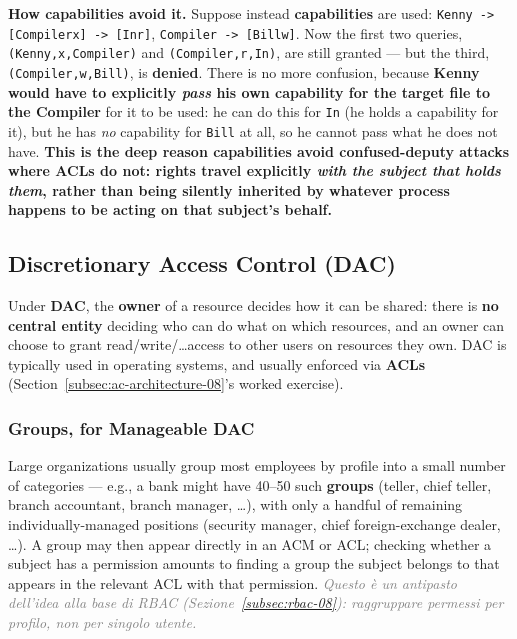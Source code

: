 \documentclass[12pt, a4paper]{article}
\begin{document}
\textcolor{ForestGreen!60!black}{\textbf{How capabilities avoid it.}} Suppose instead \textbf{capabilities} are used: \texttt{Kenny -> [Compiler\textbar x] -> [In\textbar r]}, \texttt{Compiler -> [Bill\textbar w]}. Now the first two queries, \texttt{(Kenny,x,Compiler)} and \texttt{(Compiler,r,In)}, are still granted --- but the third, \texttt{(Compiler,w,Bill)}, is \textbf{denied}. There is no more confusion, because \textbf{Kenny would have to explicitly \emph{pass} his own capability for the target file to the Compiler} for it to be used: he can do this for \texttt{In} (he holds a capability for it), but he has \emph{no} capability for \texttt{Bill} at all, so he cannot pass what he does not have. \textcolor{blue!50!black}{\textbf{This is the deep reason capabilities avoid confused-deputy attacks where ACLs do not: rights travel explicitly \emph{with the subject that holds them}, rather than being silently inherited by whatever process happens to be acting on that subject's behalf.}}













\subsection{Discretionary Access Control (DAC)}
\label{subsec:dac-08}

Under \textbf{DAC}, the \textbf{owner} of a resource decides how it can be shared: there is \textbf{no central entity} deciding who can do what on which resources, and an owner can choose to grant read/write/\dots access to other users on resources they own. DAC is typically used in operating systems, and usually enforced via \textbf{ACLs} (Section~\ref{subsec:ac-architecture-08}'s worked exercise).

\subsubsection{Groups, for Manageable DAC}
Large organizations usually group most employees by profile into a small number of categories --- e.g., a bank might have 40--50 such \textbf{groups} (teller, chief teller, branch accountant, branch manager, \dots), with only a handful of remaining individually-managed positions (security manager, chief foreign-exchange dealer, \dots). A group may then appear directly in an ACM or ACL; checking whether a subject has a permission amounts to finding a group the subject belongs to that appears in the relevant ACL with that permission. \textcolor{gray}{\textit{Questo è un antipasto dell'idea alla base di RBAC (Sezione~\ref{subsec:rbac-08}): raggruppare permessi per profilo, non per singolo utente.}}
\end{document}
